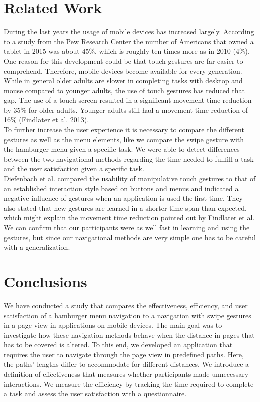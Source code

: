 \documentclass{sig-alternate-05-2015}
\begin{document}
\section{Related Work}
During the last years the usage of mobile devices has increased largely. According to a study from the Pew Research Center
the number of Americans that owned a tablet in 2015 was about 45\%, which is roughly ten times more as in 2010 (4\%). One reason
for this development could be that touch gestures are far easier to comprehend. Therefore, mobile devices become available for every generation. While in general older adults are slower in completing tasks with desktop and mouse compared to younger adults, the use of touch gestures has reduced that gap. The use of a touch screen resulted in a significant movement time reduction by 35\% for older adults. Younger adults still had a movement time reduction of 16\% (Findlater
et al. 2013).\\ To further increase the user experience it is necessary to compare the different gestures as well as the menu elements, like we compare the swipe gesture with the hamburger menu given a specific task. We were able to detect differences between the two navigational methods regarding the time needed to fullfill a task and the user satisfaction given a specific task.\\ Diefenbach et al. compared the usability of manipulative touch gestures to that of an established interaction style based on buttons and menus and indicated a negative influence of gestures when an application is used the first time. They also stated that new gestures are learned in a shorter time span than expected, which might explain the movement time reduction pointed out by Findlater
et al. We can confirm that our participants were as well fast in learning and using the gestures, but since our navigational methods are very simple one has to be careful with a generalization.
\section{Conclusions}
We have conducted a study that compares the effectiveness, efficiency, and user satisfaction of a hamburger menu navigation to a navigation with swipe
gestures in a page view in applications on mobile devices. The main goal was to investigate how these navigation methods behave when the distance in pages
that has to be covered is altered. To this end, we developed an application that requires the user to navigate through the page view in predefined
paths. Here, the paths' lengths differ to accommodate for different distances. We introduce a definition of effectiveness that measures whether participants made unnecessary interactions. We measure the efficiency by tracking the time
required to complete a task and assess the user satisfaction with a questionnaire.
\end{document}
